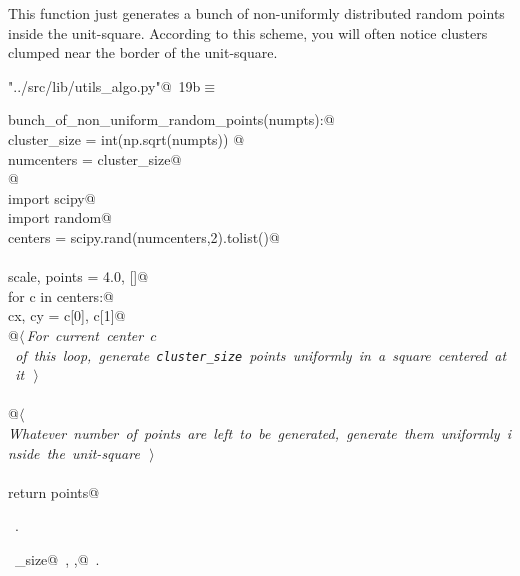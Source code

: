 \documentclass[11.5pt]{report}
\begin{document}
\vspace{-0.8cm} \newchunk This function just generates a bunch of non-uniformly distributed
random points inside the unit-square. According to this scheme, you will often notice
clusters clumped near the border of the unit-square. 
\begin{flushleft} \small\label{scrap19}\raggedright\small
{} \verb@"../src/lib/utils_algo.py"@\nobreak\ {\footnotesize {19b}}$\equiv$
\vspace{-1ex}
\begin{list}{}{} \item
\mbox{}\verb@def bunch_of_non_uniform_random_points(numpts):@\\
\mbox{}\verb@    cluster_size = int(np.sqrt(numpts)) @\\
\mbox{}\verb@    numcenters   = cluster_size@\\
\mbox{}\verb@    @\\
\mbox{}\verb@    import scipy@\\
\mbox{}\verb@    import random@\\
\mbox{}\verb@    centers = scipy.rand(numcenters,2).tolist()@\\
\mbox{}\verb@@\\
\mbox{}\verb@    scale, points = 4.0, []@\\
\mbox{}\verb@    for c in centers:@\\
\mbox{}\verb@        cx, cy = c[0], c[1]@\\
\mbox{}\verb@        @\hbox{$\langle\,${\itshape For current center $c$ of this loop, generate \verb|cluster_size| points uniformly in a square centered at it}\nobreak\ {\footnotesize {}}$\,\rangle$}\verb@@\\
\mbox{}\verb@@\\
\mbox{}\verb@    @\hbox{$\langle\,${\itshape Whatever number of points are left to be generated, generate them uniformly inside the unit-square}\nobreak\ {\footnotesize {}}$\,\rangle$}\verb@@\\
\mbox{}\verb@@\\
\mbox{}\verb@    return points@\\
\mbox{}\verb@@{\NWsep}
\end{list}
\vspace{-1.5ex}
\footnotesize
\begin{list}{}{\setlength{\itemsep}{-\parsep}\setlength{\itemindent}{-\leftmargin}}
\item \NWtxtFileDefBy\ .
\item \NWtxtIdentsDefed\nobreak\  \verb@cluster_size@\nobreak\ , \verb@scale,@\nobreak\ .
\item{}
\end{list}
\vspace{4ex}
\end{flushleft}
\end{document}
